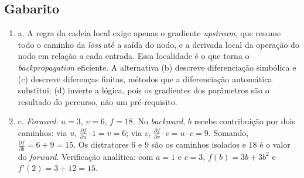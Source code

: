 \documentclass{dlproblemset}
\begin{document}
\newpage

\subsection*{Gabarito}
\color{blue}
\begin{enumerate}[1)]

    \item a. A regra da cadeia local exige apenas o gradiente \textit{upstream}, que resume todo o caminho da \textit{loss} até a saída do nodo, e a derivada local da operação do nodo em relação a cada entrada. Essa localidade é o que torna o \textit{backpropagation} eficiente. A alternativa (b) descreve diferenciação simbólica e (c) descreve diferenças finitas, métodos que a diferenciação automática substitui; (d) inverte a lógica, pois os gradientes dos parâmetros são o resultado do percurso, não um pré-requisito.

    \item c. \textit{Forward}: $u = 3$, $v = 6$, $f = 18$. No \textit{backward}, $b$ recebe contribuição por dois caminhos: via $u$, $\frac{\partial f}{\partial u} \cdot 1 = v = 6$; via $v$, $\frac{\partial f}{\partial v} \cdot c = u \cdot c = 9$. Somando, $\frac{\partial f}{\partial b} = 6 + 9 = 15$. Os distratores $6$ e $9$ são os caminhos isolados e $18$ é o valor do \textit{forward}. Verificação analítica: com $a=1$ e $c=3$, $f(b) = 3b + 3b^2$ e $f'(2) = 3 + 12 = 15$.


\end{enumerate}
\end{document}
